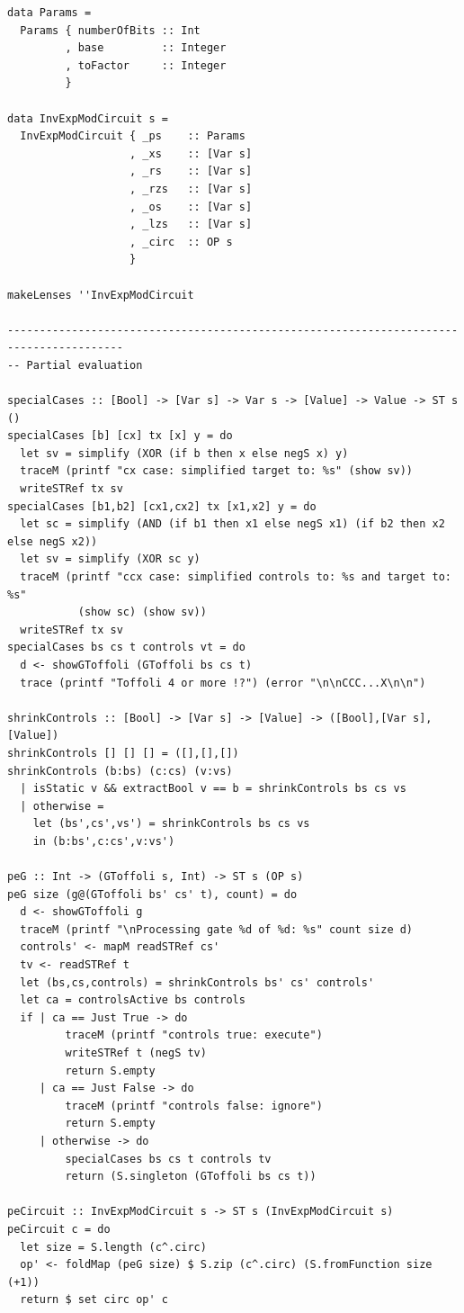 \documentclass{article}
\begin{document}
\begin{verbatim}
data Params =
  Params { numberOfBits :: Int
         , base         :: Integer
         , toFactor     :: Integer
         }

data InvExpModCircuit s =
  InvExpModCircuit { _ps    :: Params
                   , _xs    :: [Var s] 
                   , _rs    :: [Var s] 
                   , _rzs   :: [Var s]
                   , _os    :: [Var s] 
                   , _lzs   :: [Var s]
                   , _circ  :: OP s
                   }

makeLenses ''InvExpModCircuit

----------------------------------------------------------------------------------------
-- Partial evaluation

specialCases :: [Bool] -> [Var s] -> Var s -> [Value] -> Value -> ST s ()
specialCases [b] [cx] tx [x] y = do
  let sv = simplify (XOR (if b then x else negS x) y)
  traceM (printf "cx case: simplified target to: %s" (show sv))
  writeSTRef tx sv
specialCases [b1,b2] [cx1,cx2] tx [x1,x2] y = do
  let sc = simplify (AND (if b1 then x1 else negS x1) (if b2 then x2 else negS x2))
  let sv = simplify (XOR sc y)
  traceM (printf "ccx case: simplified controls to: %s and target to: %s"
           (show sc) (show sv))
  writeSTRef tx sv
specialCases bs cs t controls vt = do
  d <- showGToffoli (GToffoli bs cs t)
  trace (printf "Toffoli 4 or more !?") (error "\n\nCCC...X\n\n")

shrinkControls :: [Bool] -> [Var s] -> [Value] -> ([Bool],[Var s],[Value])
shrinkControls [] [] [] = ([],[],[])
shrinkControls (b:bs) (c:cs) (v:vs)
  | isStatic v && extractBool v == b = shrinkControls bs cs vs
  | otherwise =
    let (bs',cs',vs') = shrinkControls bs cs vs
    in (b:bs',c:cs',v:vs')

peG :: Int -> (GToffoli s, Int) -> ST s (OP s)
peG size (g@(GToffoli bs' cs' t), count) = do
  d <- showGToffoli g
  traceM (printf "\nProcessing gate %d of %d: %s" count size d)
  controls' <- mapM readSTRef cs'
  tv <- readSTRef t
  let (bs,cs,controls) = shrinkControls bs' cs' controls'
  let ca = controlsActive bs controls
  if | ca == Just True -> do
         traceM (printf "controls true: execute")
         writeSTRef t (negS tv)
         return S.empty
     | ca == Just False -> do
         traceM (printf "controls false: ignore")
         return S.empty
     | otherwise -> do
         specialCases bs cs t controls tv
         return (S.singleton (GToffoli bs cs t))

peCircuit :: InvExpModCircuit s -> ST s (InvExpModCircuit s)
peCircuit c = do
  let size = S.length (c^.circ)
  op' <- foldMap (peG size) $ S.zip (c^.circ) (S.fromFunction size (+1))
  return $ set circ op' c


\end{verbatim}
\end{document}
